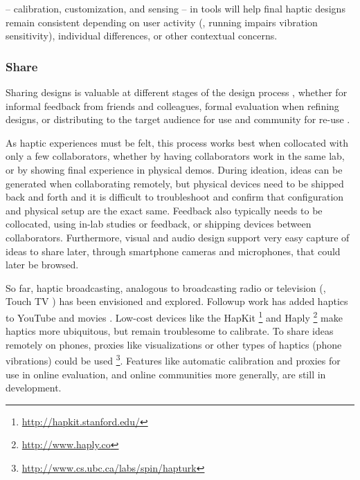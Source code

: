  -- calibration, customization, and sensing -- in tools will help final haptic designs remain consistent depending on user activity (\eg, running impairs vibration sensitivity), individual differences, or other contextual concerns.

%
%
\subsubsection{Share} 
	\label{sec:make_DP_share}
Sharing designs is valuable at different stages of the design process \cite{Kulkarni2012}, whether for informal feedback from friends and colleagues, formal evaluation when refining designs, or distributing to the target audience for use and community for re-use \cite{Shneiderman2007}.

As haptic experiences must be felt, this process works best when collocated with only a few collaborators, whether by having collaborators work in the same lab, or by showing final experience in physical demos.
During ideation, ideas can be generated when collaborating remotely, but physical devices need to be shipped back and forth and it is difficult to troubleshoot and confirm that configuration and physical setup are the exact same.
Feedback also typically needs to be collocated, using in-lab studies or feedback, or shipping devices between collaborators.
Furthermore, visual and audio design support very easy capture of ideas to share later, through smartphone cameras and microphones, that could later be browsed.

So far, haptic broadcasting, analogous to broadcasting radio or television (\eg, Touch TV \cite{Modhrain2001}) has been envisioned and explored.
Followup work has added haptics to YouTube \cite{AbdurRahman2010} and movies \cite{Kim2009}.
Low-cost devices like the HapKit \cite{Martinez2016}\footnote{\url{http://hapkit.stanford.edu/}} and Haply \cite{Gallacher2016}\footnote{\url{http://www.haply.co}} make haptics more ubiquitous, but remain troublesome to calibrate.
To share ideas remotely on phones, proxies like visualizations or other types of haptics (phone vibrations) could be used \cite{Schneider2016b}\footnote{\url{http://www.cs.ubc.ca/labs/spin/hapturk}}.
Features like automatic calibration and proxies for use in online evaluation, and online communities more generally, are still in development.



